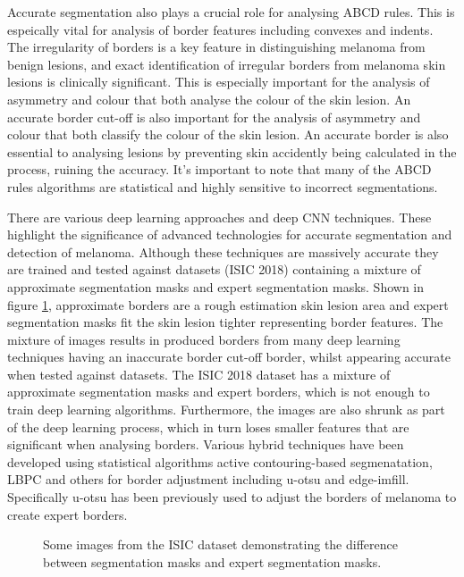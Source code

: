 Accurate segmentation also plays a crucial role for analysing ABCD rules\cite{Lee2020}. This is espeically vital for analysis of border features\cite{Pereira2020, Kaya2016} including convexes and indents. The irregularity of borders is a key feature in distinguishing melanoma from benign lesions, and exact identification of irregular borders from melanoma skin lesions is clinically significant\cite{patil2021}. This is especially important for the analysis of asymmetry and colour that both analyse the colour of the skin lesion. An accurate border cut-off is also important for the analysis of asymmetry and colour that both classify the colour of the skin lesion. An accurate border is also essential to analysing lesions by preventing skin accidently being calculated in the process, ruining the accuracy. It's important to note that many of the ABCD rules algorithms are statistical and highly sensitive to incorrect segmentations.

There are various deep learning approaches\cite{Albahli2020} and deep CNN techniques\cite{yu2017}. These highlight the significance of advanced technologies for accurate segmentation and detection of melanoma. Although these techniques are massively accurate they are trained and tested against datasets (ISIC 2018) containing a mixture of approximate segmentation masks and expert segmentation masks. Shown in figure \ref{seg-expert}, approximate borders are a rough estimation skin lesion area and expert segmentation masks fit the skin lesion tighter representing border features. The mixture of images results in produced borders from many deep learning techniques having an inaccurate border cut-off border, whilst appearing accurate when tested against datasets. The ISIC 2018 dataset has a mixture of approximate segmentation masks and expert borders, which is not enough to train deep learning algorithms. Furthermore, the images are also shrunk as part of the deep learning process, which in turn loses smaller features that are significant when analysing borders. Various hybrid techniques have been developed using statistical algorithms active contouring-based segmenatation\cite{Riaz2019}, LBPC and others for border adjustment including u-otsu and edge-imfill. Specifically u-otsu has been previously used to adjust the borders of melanoma to create expert borders\cite{}.

\begin{figure}[]
    \centering
    \caption{Some images from the ISIC dataset demonstrating the difference between segmentation masks and expert segmentation masks.}\label{seg-expert}
\end{figure}

